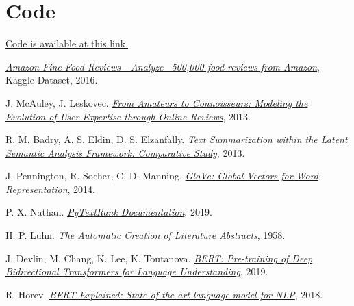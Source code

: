 \documentclass[fleqn,10pt]{SelfArx} %
\begin{document}
\section*{Code}
\href{https://github.com/RCrvro/Text-Summarization-Project}{Code is available at this link.}
\newpage
{}
\begin{thebibliography}{9}

\textit{\href{https://www.kaggle.com/snap/amazon-fine-food-reviews}{Amazon Fine Food Reviews - Analyze ~500,000 food reviews from Amazon}}, Kaggle Dataset, 2016.

J. McAuley, J. Leskovec. 
\textit{\href{http://i.stanford.edu/~julian/pdfs/www13.pdf}{From Amateurs to Connoisseurs: Modeling the Evolution of User Expertise through Online Reviews}}, 2013.

R. M. Badry, A. S. Eldin, D. S. Elzanfally. 
\textit{\href{https://pdfs.semanticscholar.org/747b/bc32e1eac5ce85dd69fb2693a7d3bd18b53b.pdf}{Text Summarization within the Latent Semantic Analysis Framework: Comparative Study}}, 2013.

J. Pennington, R. Socher, C. D. Manning. 
\textit{\href{https://nlp.stanford.edu/projects/glove/}{GloVe: Global Vectors for Word Representation}}, 2014.
 
P. X. Nathan. 
\textit{\href{https://pypi.org/project/pytextrank/
}{PyTextRank Documentation}}, 2019.

H. P. Luhn. 
\textit{\href{http://courses.ischool.berkeley.edu/i256/f06/papers/luhn58.pdf}{The Automatic Creation of Literature Abstracts}}, 1958.

J. Devlin, M. Chang, K. Lee, K. Toutanova. 
\textit{\href{https://arxiv.org/abs/1810.04805}{BERT: Pre-training of Deep Bidirectional Transformers for Language Understanding}}, 2019.

R. Horev. 
\textit{\href{https://towardsdatascience.com/bert-explained-state-of-the-art-language-model-for-nlp-f8b21a9b6270}{BERT Explained: State of the art language model for NLP}}, 2018.


\end{thebibliography}
\end{document}
